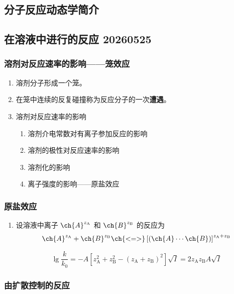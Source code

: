 \subsection{分子反应动态学简介}

\subsection{在溶液中进行的反应 20260525}

\subsubsection{溶剂对反应速率的影响——笼效应}

\begin{enumerate}
    \item 溶剂分子形成一个笼。
    \item 在笼中连续的反复碰撞称为反应分子的一次\textbf{遭遇}。
    \item 溶剂对反应速率的影响
    \begin{enumerate}
        \item 溶剂介电常数对有离子参加反应的影响
        \item 溶剂的极性对反应速率的影响
        \item 溶剂化的影响
        \item 离子强度的影响——原盐效应
    \end{enumerate}
\end{enumerate}

\subsubsection{原盐效应}

\begin{enumerate}
    \item 设溶液中离子 $\ch{A}^{z_{\mathrm{A}}}$ 和 $\ch{B}^{z_{\mathrm{B}}}$ 的反应为
    $$\ch{A}^{z_{\mathrm{A}}} + \ch{B}^{z_{\mathrm{B}}}
    \ch{<=>}
    \left[ ( \ch{A} \cdots \ch{B} ) \right]^{z_{\mathrm{A}} + z_{\mathrm{B}}}$$

    \begin{equation}
        \lg{\frac{k}{k_0}} = -A \left[z_{\mathrm{A}}^2 + z_{\mathrm{B}}^2 - (z_\mathrm{A} + z_\mathrm{B})^2\right] \sqrt{I} = 2 z_\mathrm{A} z_\mathrm{B} A \sqrt{I}  
    \end{equation}
\end{enumerate}

\subsubsection{由扩散控制的反应}

